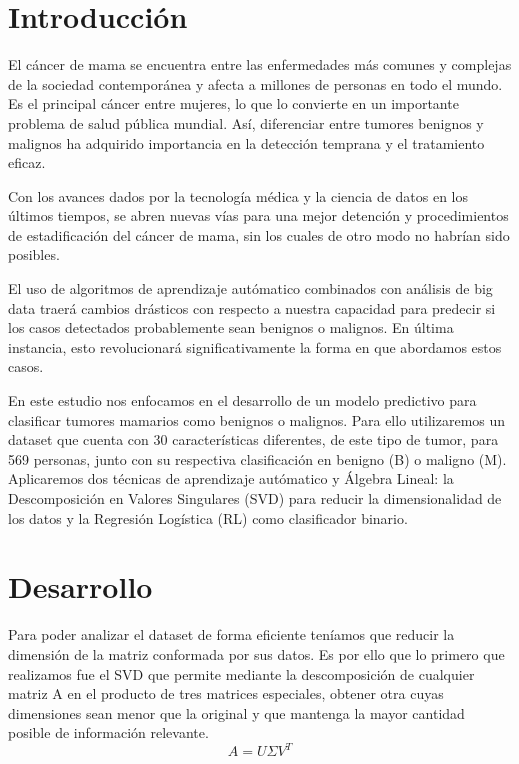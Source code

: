 \documentclass[a4paper,10pt,twocolumn]{article}
\begin{document}
\section{Introducción}\label{sec:intro}
  El cáncer de mama se encuentra entre las enfermedades más comunes y complejas de la sociedad contemporánea y afecta a millones de personas en todo el mundo. Es el principal cáncer entre mujeres, lo que lo convierte en un importante problema de salud pública mundial. Así, diferenciar entre tumores benignos y malignos ha adquirido importancia en la detección temprana y el tratamiento eficaz.

Con los avances dados por la tecnología médica y la ciencia de datos en los últimos tiempos, se abren nuevas vías para una mejor detención y procedimientos de estadificación del cáncer de mama, sin los cuales de otro modo no habrían sido posibles.

El uso de algoritmos de aprendizaje autómatico combinados con análisis de big data traerá cambios drásticos con respecto a nuestra capacidad para predecir si los casos detectados probablemente sean benignos o malignos. En última instancia, esto revolucionará significativamente la forma en que abordamos estos casos.

En este estudio nos enfocamos en el desarrollo de un modelo predictivo para clasificar tumores mamarios como benignos o malignos. Para ello utilizaremos un dataset que cuenta con 30 características diferentes, de este tipo de tumor, para 569 personas, junto con su respectiva clasificación en benigno (B) o maligno (M). Aplicaremos dos técnicas de aprendizaje autómatico y Álgebra Lineal: la Descomposición en Valores Singulares (SVD) para reducir la dimensionalidad de los datos y la Regresión Logística (RL) como clasificador binario.




\section{Desarrollo}\label{sec:dev}
  Para poder analizar el dataset de forma eficiente teníamos que reducir la dimensión de la matriz conformada por sus datos. Es por ello que lo primero que realizamos fue el SVD que permite mediante la descomposición de cualquier matriz A en el producto de tres matrices especiales, obtener otra cuyas dimensiones sean menor que la original y que mantenga la mayor cantidad posible de información relevante.
\[
    A = U \Sigma V^T
\]
\end{document}

